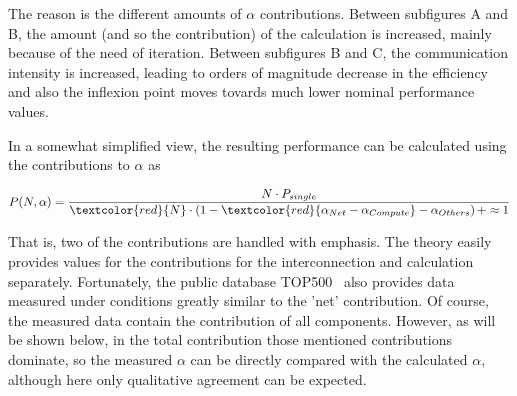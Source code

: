 {{The reason is the different amounts of $\alpha$ contributions. Between subfigures A and B,
the amount (and so the contribution) of the calculation
is increased, mainly because of the need of iteration.
Between subfigures B and C, the communication intensity is increased, leading to orders of magnitude decrease
in the efficiency %
and also the inflexion point moves tovards much lower
nominal performance values.
}
%
}%


{
In a somewhat simplified view, the 
resulting performance can be calculated using the contributions to $\alpha$ as


\begin{equation}
P(N,\alpha) = \frac{N\cdot P_{single}}{\textcolor{red}{N}\cdot \left(1-\textcolor{red}{\alpha_{Net} -\alpha_{Compute}} -\alpha_{Others}    \right)+\approx 1}
\end{equation}

\noindent 
That is, two of the contributions are handled with emphasis. The theory easily provides values for the contributions for
the interconnection and calculation separately.  
Fortunately, the public database TOP500~\cite{Top500:2016}
also provides data measured under conditions greatly similar
to the 'net' contribution.
Of course, the measured data contain the contribution of all components.
However, as will be shown below, in the total contribution those mentioned contributions dominate,
so the measured $\alpha$ can be directly compared with the calculated
$\alpha$, although here only qualitative agreement can be expected.
}


